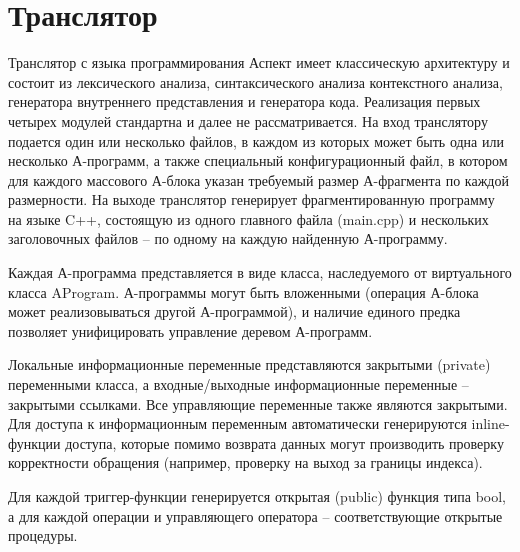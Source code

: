 \documentclass[11pt]{article}
\begin{document}
\section{Транслятор}
Транслятор с языка программирования Аспект имеет классическую архитектуру и состоит из лексического анализа, синтаксического анализа контекстного анализа, генератора внутреннего представления и генератора кода. Реализация первых четырех модулей стандартна и далее не рассматривается.
На вход транслятору подается один или несколько файлов, в каждом из которых может быть одна или несколько А-программ, а также специальный конфигурационный файл, в котором для каждого массового А-блока указан требуемый размер А-фрагмента по каждой размерности. На выходе транслятор генерирует фрагментированную программу на языке C++, состоящую из одного главного файла (main.cpp) и нескольких заголовочных файлов – по одному на каждую найденную А-программу.\par
Каждая А-программа представляется в виде класса, наследуемого от виртуального класса \-AProgram. А-программы могут быть вложенными (операция А-блока может реализовываться другой А-программой), и наличие единого предка позволяет унифицировать управление деревом А-программ.\par
Локальные информационные переменные представляются закрытыми (private) переменными класса, а входные/выходные информационные переменные – закрытыми ссылками. Все управляющие переменные также являются закрытыми. Для доступа к информационным переменным автоматически генерируются inline-функции доступа, которые помимо возврата данных могут производить проверку корректности обращения (например, проверку на выход за границы индекса).\par
Для каждой триггер-функции генерируется открытая (public) функция типа bool, а для каждой операции и управляющего оператора – соответствующие открытые процедуры.
\end{document}
